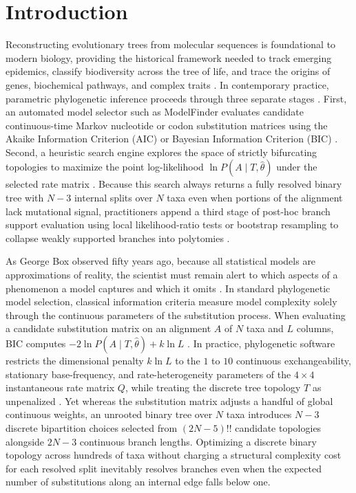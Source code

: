 \documentclass[11pt,a4paper]{article}
\begin{document}
\section{Introduction}

Reconstructing evolutionary trees from molecular sequences is foundational to modern biology, providing the historical framework needed to track emerging epidemics, classify biodiversity across the tree of life, and trace the origins of genes, biochemical pathways, and complex traits \citep{felsenstein1981evolutionary,woese2000aminoacyl,parks2018gtdb}. In contemporary practice, parametric phylogenetic inference proceeds through three separate stages \citep{posada2004model}. First, an automated model selector such as ModelFinder evaluates candidate continuous-time Markov nucleotide or codon substitution matrices using the Akaike Information Criterion (AIC) or Bayesian Information Criterion (BIC) \citep{akaike1974new,schwarz1978estimating,kalyaanamoorthy2017modelfinder}. Second, a heuristic search engine explores the space of strictly bifurcating topologies to maximize the point log-likelihood $\ln P(A \mid T, \hat{\theta})$ under the selected rate matrix \citep{guindon2010new,price2010fasttree,kozlov2019raxml,minh2020iqtree}. Because this search always returns a fully resolved binary tree with $N - 3$ internal splits over $N$ taxa even when portions of the alignment lack mutational signal, practitioners append a third stage of post-hoc branch support evaluation using local likelihood-ratio tests \citep{anisimova2011survey} or bootstrap resampling \citep{felsenstein1985confidence,hoang2018ufboot2} to collapse weakly supported branches into polytomies \citep{zhang2018astral}.

As George Box observed fifty years ago, because all statistical models are approximations of reality, the scientist must remain alert to which aspects of a phenomenon a model captures and which it omits \citep{box1976science}. In standard phylogenetic model selection, classical information criteria measure model complexity solely through the continuous parameters of the substitution process. When evaluating a candidate substitution matrix on an alignment $A$ of $N$ taxa and $L$ columns, BIC computes $-2\ln P(A \mid T, \hat{\theta}) + k\ln L$ \citep{schwarz1978estimating}. In practice, phylogenetic software restricts the dimensional penalty $k\ln L$ to the $1$ to $10$ continuous exchangeability, stationary base-frequency, and rate-heterogeneity parameters of the $4 \times 4$ instantaneous rate matrix $Q$, while treating the discrete tree topology $T$ as unpenalized \citep{susko2020use}. Yet whereas the substitution matrix adjusts a handful of global continuous weights, an unrooted binary tree over $N$ taxa introduces $N - 3$ discrete bipartition choices selected from $(2N - 5)!!$ candidate topologies alongside $2N - 3$ continuous branch lengths. Optimizing a discrete binary topology across hundreds of taxa without charging a structural complexity cost for each resolved split inevitably resolves branches even when the expected number of substitutions along an internal edge falls below one.
\end{document}
